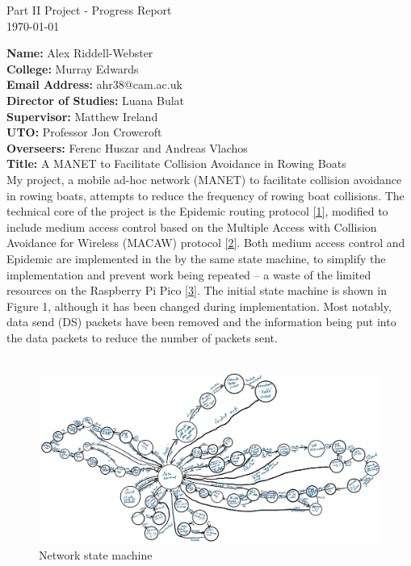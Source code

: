 \documentclass[10pt, a4paper]{article}
\begin{document}
\begin{center}
\Huge{Part II Project - Progress Report} \\
\Large{\today} \\
\end{center}
\textbf{Name:} Alex Riddell-Webster \\
\textbf{College:} Murray Edwards \\
\textbf{Email Address:} ahr38@cam.ac.uk \\
\textbf{Director of Studies:} Luana Bulat \\
\textbf{Supervisor:} Matthew Ireland \\
\textbf{UTO:} Professor Jon Crowcroft\\
\textbf{Overseers:}  Ferenc Huszar and Andreas Vlachos \\
\textbf{Title:} A MANET to Facilitate Collision Avoidance in Rowing Boats
\vspace{20px}\\
My project, a mobile ad-hoc network (MANET) to facilitate collision avoidance in rowing boats, attempts to reduce the frequency of rowing boat collisions. The technical core of the project is the Epidemic routing protocol \hyperref[epidemic]{[1]}, modified to include medium access control based on the Multiple Access with Collision Avoidance for Wireless (MACAW) protocol \hyperref[macaw]{[2]}. Both medium access control and Epidemic are implemented in the by the same state machine, to simplify the implementation and prevent work being repeated -- a waste of the limited resources on the Raspberry Pi Pico \hyperref[pico]{[3]}. The initial state machine is shown in Figure 1, although it has been changed during implementation. Most notably, data send (DS) packets have been removed and the information being put into the data packets to reduce the number of packets sent. \\ \\
\begin{figure}[h]
\caption{Network state machine}
\begin{center}
\includegraphics[scale=0.4]{net.jpg}
\end{center}
\end{figure} \\
\end{document}
